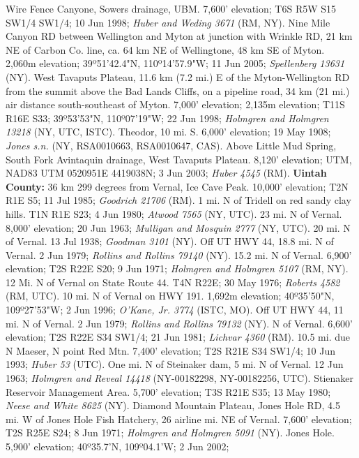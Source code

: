 Wire Fence Canyone, Sowers drainage, UBM. 7,600' elevation;
T6S R5W S15 SW1/4 SW1/4; 10 Jun 1998; \textit{Huber and Weding 3671} (RM, NY).
Nine Mile Canyon RD between Wellington and Myton at junction with Wrinkle RD,
21 km NE of Carbon Co. line, ca. 64 km NE of Wellingtone, 48 km SE of Myton.
2,060m elevation; 39º51'42.4"N, 110º14'57.9"W; 11 Jun 2005;
\textit{Spellenberg 13631} (NY).
West Tavaputs Plateau, 11.6 km (7.2 mi.) E of the Myton-Wellington RD from the
summit above the Bad Lands Cliffs, on a pipeline road, 34 km (21 mi.) air
distance south-southeast of Myton. 7,000' elevation; 2,135m elevation;
T11S R16E S33; 39º53'53"N, 110º07'19"W; 22 Jun 1998;
\textit{Holmgren and Holmgren 13218} (NY, UTC, ISTC).
Theodor, 10 mi. S. 6,000' elevation; 19 May 1908;
\textit{Jones s.n.} (NY, RSA0010663, RSA0010647, CAS).
Above Little Mud Spring, South Fork Avintaquin drainage, West Tavaputs Plateau.
8,120' elevation; UTM, NAD83 UTM 0520951E 4419038N; 3 Jun 2003;
\textit{Huber 4545} (RM).
  \textbf{Uintah County:}
36 km 299 degrees from Vernal, Ice Cave Peak. 10,000' elevation; T2N R1E S5;
11 Jul 1985; \textit{Goodrich 21706} (RM).
1 mi. N of Tridell on red sandy clay hills. T1N R1E S23; 4 Jun 1980;
\textit{Atwood 7565} (NY, UTC).
23 mi. N of Vernal. 8,000' elevation; 20 Jun 1963;
\textit{Mulligan and Mosquin 2777} (NY, UTC).
20 mi. N of Vernal. 13 Jul 1938; \textit{Goodman 3101} (NY).
Off UT HWY 44, 18.8 mi. N of Vernal. 2 Jun 1979;
\textit{Rollins and Rollins 79140} (NY).
15.2 mi. N of Vernal. 6,900' elevation; T2S R22E S20; 9 Jun 1971;
\textit{Holmgren and Holmgren 5107} (RM, NY).
12 Mi. N of Vernal on State Route 44. T4N R22E; 30 May 1976;
\textit{Roberts 4582} (RM, UTC).
10 mi. N of Vernal on HWY 191. 1,692m elevation;
40º35'50"N, 109º27'53"W; 2 Jun 1996; \textit{O'Kane, Jr. 3774} (ISTC, MO).
Off UT HWY 44, 11 mi. N of Vernal. 2 Jun 1979;
\textit{Rollins and Rollins 79132} (NY).
N of Vernal. 6,600' elevation; T2S R22E S34 SW1/4; 21 Jun 1981;
\textit{Lichvar 4360} (RM).
10.5 mi. due N Maeser, N point Red Mtn. 7,400' elevation; T2S R21E S34 SW1/4;
10 Jun 1993; \textit{Huber 53} (UTC).
One mi. N of Steinaker dam, 5 mi. N of Vernal. 12 Jun 1963;
\textit{Holmgren and Reveal 14418} (NY-00182298, NY-00182256, UTC).
Stienaker Reservoir Management Area. 5,700' elevation; T3S R21E S35;
13 May 1980; \textit{Neese and White 8625} (NY).
Diamond Mountain Plateau, Jones Hole RD, 4.5 mi. W of Jones Hole Fish Hatchery,
26 airline mi. NE of Vernal. 7,600' elevation; T2S R25E S24; 8 Jun 1971;
\textit{Holmgren and Holmgren 5091} (NY).
Jones Hole. 5,900' elevation; 40º35.7'N, 109º04.1'W; 2 Jun 2002;
